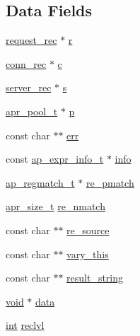 \subsection*{Data Fields}
\begin{DoxyCompactItemize}
\item 
\hyperlink{structrequest__rec}{request\+\_\+rec} $\ast$ \hyperlink{structap__expr__eval__ctx__t_a150a98e94f240dc8ffe5dd451f0ce388}{r}
\item 
\hyperlink{structconn__rec}{conn\+\_\+rec} $\ast$ \hyperlink{structap__expr__eval__ctx__t_a6561f81a4258c997a2e7a2ce4e53d2b9}{c}
\item 
\hyperlink{structserver__rec}{server\+\_\+rec} $\ast$ \hyperlink{structap__expr__eval__ctx__t_a5b31e6f1ba8756f0c24bcb6c46ea9903}{s}
\item 
\hyperlink{structapr__pool__t}{apr\+\_\+pool\+\_\+t} $\ast$ \hyperlink{structap__expr__eval__ctx__t_a1f4c86e95a88939389b0ffcc43d2a014}{p}
\item 
const char $\ast$$\ast$ \hyperlink{structap__expr__eval__ctx__t_a336542556832ac0c0c2e025067328f87}{err}
\item 
const \hyperlink{structap__expr__info__t}{ap\+\_\+expr\+\_\+info\+\_\+t} $\ast$ \hyperlink{structap__expr__eval__ctx__t_afb8cb1306a7d14f55885f89bd895b679}{info}
\item 
\hyperlink{structap__regmatch__t}{ap\+\_\+regmatch\+\_\+t} $\ast$ \hyperlink{structap__expr__eval__ctx__t_a2fb26ba0831f65b26b8c84f0275e4183}{re\+\_\+pmatch}
\item 
\hyperlink{group__apr__platform_gaaa72b2253f6f3032cefea5712a27540e}{apr\+\_\+size\+\_\+t} \hyperlink{structap__expr__eval__ctx__t_a7fca153e0343b8b9bc5cb0c9d4b8249d}{re\+\_\+nmatch}
\item 
const char $\ast$$\ast$ \hyperlink{structap__expr__eval__ctx__t_a0337d6d73ed1d6b0cebdc89dd1723d6f}{re\+\_\+source}
\item 
const char $\ast$$\ast$ \hyperlink{structap__expr__eval__ctx__t_a9f3c4c51c53ac551a8d10f87e8b09fea}{vary\+\_\+this}
\item 
const char $\ast$$\ast$ \hyperlink{structap__expr__eval__ctx__t_af5eb995e550d9073c1f51ecb2078e108}{result\+\_\+string}
\item 
\hyperlink{group__MOD__ISAPI_gacd6cdbf73df3d9eed42fa493d9b621a6}{void} $\ast$ \hyperlink{structap__expr__eval__ctx__t_af0b57d0d9335f30b2c6e09624b05e961}{data}
\item 
\hyperlink{pcre_8txt_a42dfa4ff673c82d8efe7144098fbc198}{int} \hyperlink{structap__expr__eval__ctx__t_ac3a8f194fc0c881a55ad7074e9bcc92b}{reclvl}
\end{DoxyCompactItemize}


